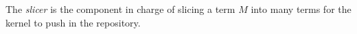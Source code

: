 \documentclass[9pt,authoryear]{sigplanconf}
\begin{document}
The \emph{slicer} is the component in charge of slicing a term $M$
into many terms for the kernel to push in the repository.







\end{document}
